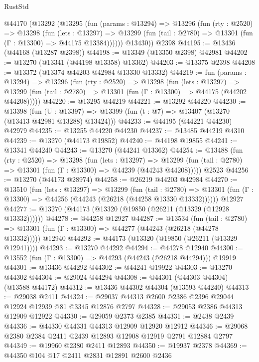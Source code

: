 \begin{lexlean}{RustStd}
\begin{coremodule}
    @44170
      (@13292
        (@13295
          (fun (params : @13294) =>
          @13296
            (fun (rty : @2520) =>
            @13298
              (fun (lets : @13297) =>
              @13299 (fun (tail : @2780) => @13301 (fun (Γ : @13300) => @44175 @13384))))))
        @13430))
    @2398
@44195 := @13436 (@44168 (@13287 @2398))
@44198 := @13349 (@13350 @2398) @42981
@44202 := @13270 (@13341 (@44198 @13358) @13362)
@44203 := @13375 @2398
@44208 := @13372 (@13374 @44203 @42984 @13330 @13332)
@44219 := fun (params : @13294) =>
  @13296
    (fun (rty : @2520) =>
    @13298
      (fun (lets : @13297) =>
      @13299 (fun (tail : @2780) => @13301 (fun (Γ : @13300) => @44175 (@44202 @44208)))))
@44220 := @13295 @44219
@44221 := @13292 @44220
@44230 := @13398
    (fun (U : @13397) => @13399 (fun (t : @7) => @13407 (@13270 (@13413 @42981 @13288) @13424)))
@44233 := @44195 (@44221 @44230) @42979
@44235 := @13255 @44220 @44230
@44237 := @13485 @44219 @4310
@44239 := @13270 (@44173 @19852)
@44240 := @44198 @19855
@44241 := @13341 @44240
@44243 := @13270 (@44241 @13362)
@44254 := @13488
    (fun (rty : @2520) =>
    @13298
      (fun (lets : @13297) =>
      @13299 (fun (tail : @2780) => @13301 (fun (Γ : @13300) => @44239 (@44243 @44208)))))
    @2523
@44256 := @13270 (@44173 @28974)
@44258 := @26219 @44203 @42984
@44270 := @13510
    (fun (lets : @13297) =>
    @13299
      (fun (tail : @2780) =>
      @13301 (fun (Γ : @13300) => @44256 (@44243 (@26218 (@44258 @13330 @13332))))))
    @12927
@44277 := @13270 (@44173 (@13320 (@19850 (@26211 (@13329 (@12928 @13332))))))
@44278 := @44258 @12927
@44287 := @13534
    (fun (tail : @2780) => @13301 (fun (Γ : @13300) => @44277 (@44243 (@26218 (@44278 @13332)))))
    @12940
@44292 := @44173 (@13320 (@19850 (@26211 (@13329 @12941))))
@44293 := @13270 @44292
@44294 := @44278 @12940
@44300 := @13552 (fun (Γ : @13300) => @44293 (@44243 (@26218 @44294))) @19919
@44301 := @13436 @44292
@44302 := @44241 @19922
@44303 := @13270 @44302
@44304 := @29024 @44294
@44308 := @44301 (@44303 @44304) (@13588 @44172)
@44312 := @13436 @44302 @44304 (@13593 @44240)
@44313 := @29038 @2411
@44324 := @29037 @44313 @2600 @2386 @2396 @29044 @12924 @12939 @81 @3345 @12876 @2797
@44328 := @29053 @2386 @44313 @12909 @12922
@44330 := @29059 @2373 @2385
@44331 := @2438 @2439
@44336 := @44330 @44331 @44313 @12909 @12920 @12912
@44346 := @29068 @2380 @2384 @2411 @2439 @12893 @12908 @12919 @2791 @12884 @2797
@44349 := @19960 @2380 @2411 @12893
@44350 := @19937 @2378
@44369 := @44350
    @104
    @17
    @2411
    @2831
    @12891
    @2600
    @2436

\end{coremodule}
\end{lexlean}
